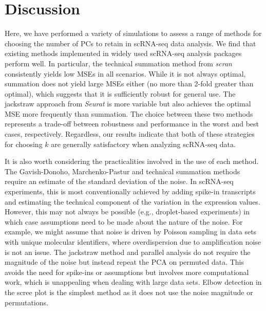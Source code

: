 \documentclass[10pt,letterpaper]{article}
\begin{document}
\section{Discussion}
Here, we have performed a variety of simulations to assess a range of methods for choosing the number of PCs to retain in scRNA-seq data analysis.
We find that existing methods implemented in widely used scRNA-seq analysis packages perform well.
In particular, the technical summation method from \textit{scran} consistently yields low MSEs in all scenarios.
While it is not always optimal, summation does not yield large MSEs either (no more than 2-fold greater than optimal), which suggests that it is sufficiently robust for general use.
The jackstraw approach from \textit{Seurat} is more variable but also achieves the optimal MSE more frequently than summation.
The choice between these two methods represents a trade-off between robustness and performance in the worst and best cases, respectively.
Regardless, our results indicate that both of these strategies for choosing $k$ are generally satisfactory when analyzing scRNA-seq data.

It is also worth considering the practicalities involved in the use of each method.
The Gavish-Donoho, Marchenko-Pastur and technical summation methods require an estimate of the standard deviation of the noise.
In scRNA-seq experiments, this is most conventionally achieved by adding spike-in transcripts and estimating the technical component of the variation in the expression values.
However, this may not always be possible (e.g., droplet-based experiments) in which case assumptions need to be made about the nature of the noise.
For example, we might assume that noise is driven by Poisson sampling in data sets with unique molecular identifiers, where overdispersion due to amplification noise is not an issue.
The jackstraw method and parallel analysis do not require the magnitude of the noise but instead repeat the PCA on permuted data.
This avoids the need for spike-ins or assumptions but involves more computational work, which is unappealing when dealing with large data sets.
Elbow detection in the scree plot is the simplest method as it does not use the noise magnitude or permutations.
\end{document}

